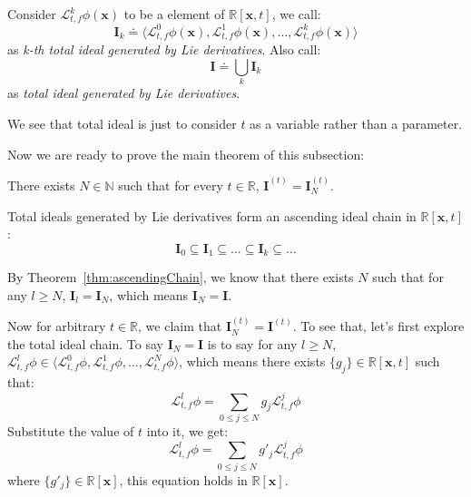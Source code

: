 \documentclass{jssc}
\begin{document}
\begin{definition}
\label{def:lieTot}
Consider $\mathcal{L}_{t, f}^k \phi(\boldsymbol{x})$ to be a element of $\mathbb{R}[\boldsymbol{x}, t]$, we call:
	\begin{equation*}
		\boldsymbol{I}_k \doteq \langle \mathcal{L}_{t, f}^0 \phi(\boldsymbol{x}), \mathcal{L}_{t, f}^1 \phi(\boldsymbol{x}), \dots, \mathcal{L}_{t, f}^k \phi(\boldsymbol{x}) \rangle
	\end{equation*}	
	as \emph{k-th total ideal generated by Lie derivatives}. Also call:
	\begin{equation*}
		\boldsymbol{I} \doteq \bigcup_k \boldsymbol{I}_k
	\end{equation*}
	as \emph{total ideal generated by Lie derivatives}.
\end{definition}

We see that total ideal is just to consider $t$ as a variable rather than a parameter.

Now we are ready to prove the main theorem of this subsection:
\begin{theorem}
\label{thm:lieIdeal}
There exists $N \in \mathbb{N}$ such that for every $t \in \mathbb{R}$, $\boldsymbol{I}^{(t)} = \boldsymbol{I}_N^{(t)}$.
\end{theorem}

\proof
Total ideals generated by Lie derivatives form an ascending ideal chain in $\mathbb{R}[\boldsymbol{x}, t]$:
\begin{equation*}
	\boldsymbol{I}_0 \subseteq \boldsymbol{I}_1 \subseteq \dots \subseteq \boldsymbol{I}_{k} \subseteq \dots
\end{equation*}

By Theorem~\ref{thm:ascendingChain}, we know that there exists $N$ such that for any $l \geq N$, $\boldsymbol{I}_l = \boldsymbol{I}_N$, which means $\boldsymbol{I}_N = \boldsymbol{I}$.

Now for arbitrary $t \in \mathbb{R}$, we claim that $\boldsymbol{I}_N^{(t)} = \boldsymbol{I}^{(t)}$. To see that, let's first explore the total ideal chain. To say $\boldsymbol{I}_N = \boldsymbol{I}$ is to say for any $l \geq N$, $\mathcal{L}_{t, f}^l \phi  \in \langle \mathcal{L}_{t, f}^0 \phi, \mathcal{L}_{t, f}^1 \phi, \dots, \mathcal{L}_{t, f}^N \phi \rangle$, which means there exists $\{ g_j \} \in \mathbb{R} [\boldsymbol{x}, t]$ such that:
	\begin{equation*}
		\mathcal{L}_{t, f}^l \phi = \sum_{0 \leq j \leq N} g_j \mathcal{L}_{t, f}^j \phi
	\end{equation*}
Substitute the value of $t$ into it, we get:
	\begin{equation*}
		\mathcal{L}_{t, f}^l \phi = \sum_{0 \leq j \leq N} g'_j \mathcal{L}_{t, f}^j \phi
	\end{equation*}
where $\{ g'_j \} \in \mathbb{R} [\boldsymbol{x}]$, this equation holds in $\mathbb{R} [\boldsymbol{x}]$.
\end{document}
